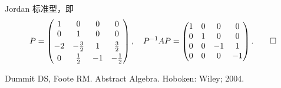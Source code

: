 \documentclass[fontset=none,zihao=-4]{Notes}
\begin{document}
\begin{solution}
  Jordan 标准型，即
  \[
    P=
    \begin{pmatrix}
      1 & 0 & 0 & 0 \\
      0 & 1 & 0 & 0 \\[1mm]
      -2 & -\frac{3}{2} & 1 & \frac{3}{2} \\[1mm]
      0 & \frac{1}{2} & -1 & -\frac{1}{2}
    \end{pmatrix}  ,\quad
    P^{-1}AP=
    \begin{pmatrix}
      1 & 0 & 0 & 0 \\
      0 & 1 & 0 & 0 \\
      0 & 0 & -1 & 1 \\
      0 & 0 & 0 & -1
    \end{pmatrix}.\qedhere
  \]
\end{solution}

\begin{thebibliography}{99}
    Dummit DS, Foote RM. Abstract Algebra. Hoboken: Wiley; 2004.
\end{thebibliography}
\end{document}
